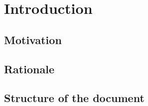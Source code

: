 \chapter{Introduction}

\section{Motivation}

\section{Rationale}

\section{Structure of the document}